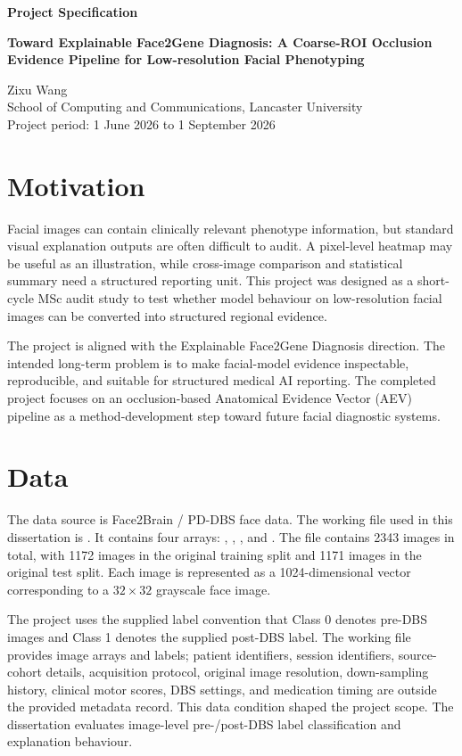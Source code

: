 \documentclass[oneside,12pt]{article}
\newcommand\thesistitle{Toward Explainable Face2Gene Diagnosis: A Coarse-ROI Occlusion Evidence Pipeline for Low-resolution Facial Phenotyping}
\newcommand\authorname{Zixu Wang}
\begin{document}
\begin{center}
{\Large\bfseries Project Specification\par}
\vspace{0.3cm}
{\bfseries \thesistitle\par}
\vspace{0.25cm}
\authorname\\
School of Computing and Communications, Lancaster University\\
Project period: 1 June 2026 to 1 September 2026
\end{center}
\vspace{0.2cm}

\section*{Motivation}

Facial images can contain clinically relevant phenotype information, but standard visual explanation outputs are often difficult to audit. A pixel-level heatmap may be useful as an illustration, while cross-image comparison and statistical summary need a structured reporting unit. This project was designed as a short-cycle MSc audit study to test whether model behaviour on low-resolution facial images can be converted into structured regional evidence.

The project is aligned with the Explainable Face2Gene Diagnosis direction. The intended long-term problem is to make facial-model evidence inspectable, reproducible, and suitable for structured medical AI reporting. The completed project focuses on an occlusion-based Anatomical Evidence Vector (AEV) pipeline as a method-development step toward future facial diagnostic systems.

\section*{Data}

The data source is Face2Brain / PD-DBS face data. The working file used in this dissertation is . It contains four arrays: \texttt{}, \texttt{}, \texttt{}, and \texttt{}. The file contains 2343 images in total, with 1172 images in the original training split and 1171 images in the original test split. Each image is represented as a 1024-dimensional vector corresponding to a $32\times32$ grayscale face image.

The project uses the supplied label convention that Class 0 denotes pre-DBS images and Class 1 denotes the supplied post-DBS label. The working file provides image arrays and labels; patient identifiers, session identifiers, source-cohort details, acquisition protocol, original image resolution, down-sampling history, clinical motor scores, DBS settings, and medication timing are outside the provided metadata record. This data condition shaped the project scope. The dissertation evaluates image-level pre-/post-DBS label classification and explanation behaviour.
\end{document}
